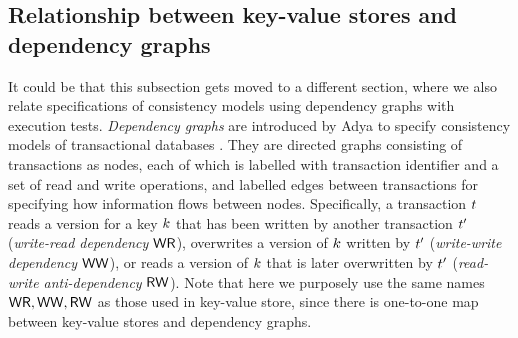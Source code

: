 \subsection{Relationship between key-value stores and dependency graphs}
\ac{It could be that this subsection gets moved to a different section, where 
we also relate specifications of consistency models using dependency graphs
with execution tests.}
\emph{Dependency graphs} are introduced by Adya to specify consistency models of transactional databases \cite{adya}. 
They are directed graphs consisting of transactions as nodes, 
each of which is labelled with transaction identifier and a set of read and write operations,
and labelled edges between transactions for specifying how information flows between nodes. 
Specifically, a transaction $t$ reads a version for a key $k$ that has been written by another transaction $t'$ 
(\emph{write-read dependency} \( \mathsf{WR}\)), overwrites a version of $k$ written by $t'$ (\emph{write-write dependency} \( \mathsf{WW} \)),
or reads a version of $k$ that is later overwritten by $t'$ (\emph{read-write anti-dependency} \( \mathsf{RW} \)).
Note that here we purposely use the same names \( \mathsf{WR}, \mathsf{WW}, \mathsf{RW} \) as those used in key-value store,
since there is one-to-one map between key-value stores and dependency graphs.



